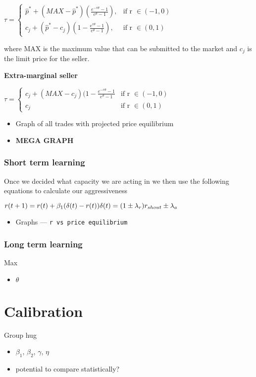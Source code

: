 \documentclass{acm_proc_article-sp}
\begin{document}
$\tau =
\begin{cases}
      \hat{p}^* + (MAX-\hat{p}^*)( \frac{e^{-r\theta}-1}{e^{\theta}-1}), &  \text{if r } \in (-1,0)  \\
      c_j + (\hat{p}^*-c_j)(1-\frac{e^{r\theta}-1}{e^\theta-1}), & \text{if
      r } \in (0,1)
\end{cases}$

where MAX is the maximum value that can be submitted to the market and $c_j$ is
the limit price for the seller.

\textbf{Extra-marginal seller}

$\tau =
\begin{cases}
      c_j + (MAX-c_j)(1-\frac{e^{-r\theta}-1}{e^\theta-1} &  \text{if r } \in (-1,0)  \\
      c_j & \text{if r } \in (0,1)
\end{cases}$

\begin{itemize} \itemsep0pt
	\item Graph of all trades with projected price equilibrium
	\item \textbf{MEGA GRAPH}
\end{itemize}


\subsubsection{Short term learning} \label{sec:AA_short_term_learning}
Once we decided what capacity we are acting in we then use the following
equations to calculate our aggressiveness

$r(t+1) = r(t) + \beta_1(\delta(t) - r(t))\\\delta(t) = (1 \pm
\lambda_r)r_{shout} \pm \lambda_a$
\begin{itemize} \itemsep0pt
	\item Graphs --- \tt r \rm vs price equilibrium
\end{itemize}

\subsubsection{Long term learning} \label{sec:AA_long_term_learning}
Max
\begin{itemize} \itemsep0pt
	\item $\theta$
\end{itemize}



\section{Calibration} \label{sec:calibration}
Group hug
\begin{itemize} \itemsep0pt
	\item $\beta_1$, $\beta_2$, $\gamma$, $\eta$
	\item potential to compare statistically?
\end{itemize}
\end{document}
